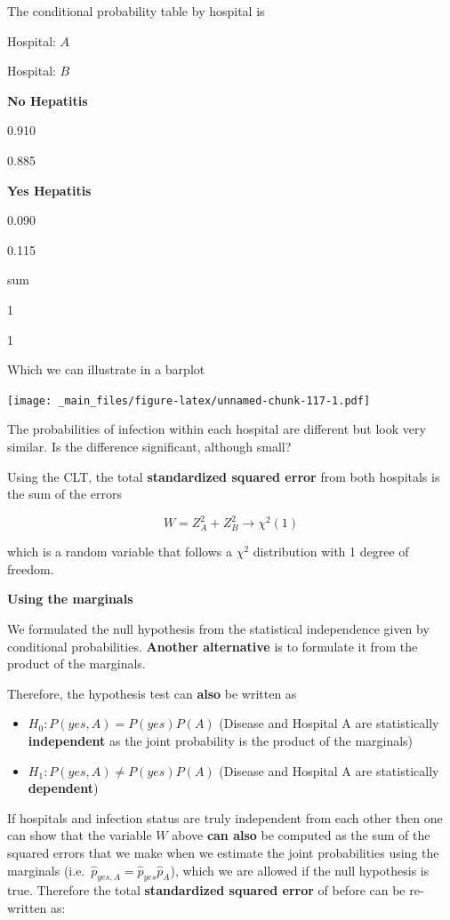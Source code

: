 \documentclass[
]{book}
\providecommand{\tightlist}{%
  \setlength{\itemsep}{0pt}\setlength{\parskip}{0pt}}
\begin{document}
The conditional probability table by hospital is

Hospital: \(A\)

Hospital: \(B\)

\textbf{No Hepatitis}

0.910

0.885

\textbf{Yes Hepatitis}

0.090

0.115

sum

1

1

Which we can illustrate in a barplot

\texttt{[image: \_main\_files/figure-latex/unnamed-chunk-117-1.pdf]}

The probabilities of infection within each hospital are different but look very similar. Is the difference significant, although small?

Using the CLT, the total \textbf{standardized squared error} from both hospitals is the sum of the errors

\[W= Z_A^2+Z_B^2\rightarrow \chi^2(1)\]

which is a random variable that follows a \(\chi^2\) distribution with 1 degree of freedom.

\textbf{Using the marginals}

We formulated the null hypothesis from the statistical independence given by conditional probabilities. \textbf{Another alternative} is to formulate it from the product of the marginals.

Therefore, the hypothesis test can \textbf{also} be written as

\begin{itemize}
\tightlist
\item
  \(H_0:P(yes, A)=P(yes)P(A)\) (Disease and Hospital A are statistically \textbf{independent} as the joint probability is the product of the marginals)
\item
  \(H_1:P(yes, A)\neq P(yes)P(A)\)
  (Disease and Hospital A are statistically \textbf{dependent})
\end{itemize}

If hospitals and infection status are truly independent from each other then one can show that the variable \(W\) above \textbf{can also} be computed as the sum of the squared errors that we make when we estimate the joint probabilities using the marginals (i.e.~\(\hat{p}_{yes,A}=\hat{p}_{yes}\hat{p}_A\)), which we are allowed if the null hypothesis is true. Therefore the total \textbf{standardized squared error} of before can be re-written as:
\end{document}
